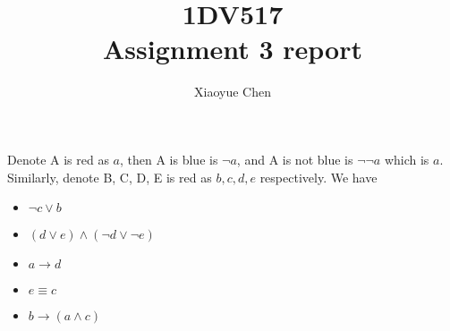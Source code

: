 \documentclass[a4paper]{article}
\author{Xiaoyue Chen}
\title{1DV517\\Assignment 3 report}
\begin{document}
\maketitle

\section{}
\subsection{}
Denote A is red as $a$, then A is blue is
$\neg a$, and A is not blue is $\neg \neg a$ which is
$a$. Similarly, denote B, C, D, E is red as
$b,c,d,e$ respectively. We have

\begin{itemize}
	\item $\lnot c \lor b$
	\item $(d \lor e) \land (\lnot d \lor \lnot e)$
	\item $a \rightarrow d$
	\item $e \equiv c$
	\item $b \rightarrow (a \land c)$
\end{itemize}
\end{document}
